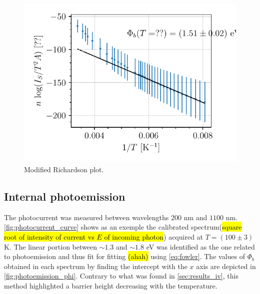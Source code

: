 \begin{figure}[htbp]
    \centering
    \includegraphics[scale=1]{figures/richardson.pdf}
    \caption{Modified Richardson plot.}
    \label{fig:richardson}
\end{figure}

\subsection{Internal photoemission} \label{sec:results_photoemission}
The photocurrent was measured between wavelengths $200$ nm and $1100$ nm.
\autoref{fig:photocurrent_curve} shows as an exemple the calibrated spectrum(\hl{square root of intensity of current vs $E$ of incoming photon}) acquired at $T = (100\pm3)$ K.
The linear portion between $\sim 1.3$ and $\sim 1.8$ eV was identified as the one related to photoemission and thus fit for fitting \hl{(ahah)} using \autoref{eq:fowler}.
The values of $\Phi_b$ obtained in each spectrum by finding the intercept with the $x$ axis are depicted in \autoref{fig:photoemission_phi}.
Contrary to what was found in  \autoref{sec:results_iv}, this method highlighted a barrier height decreasing with the temperature.



